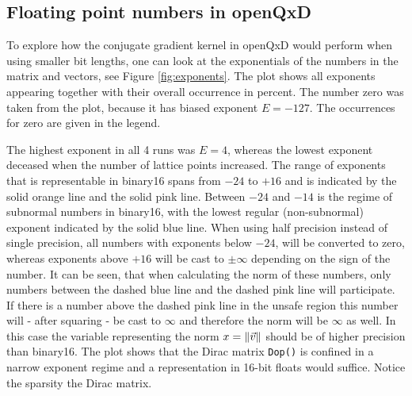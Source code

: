 \documentclass{article}
\theoremstyle{plain} %
\theoremstyle{convention} %
\theoremstyle{remark} %
\def\code#1{\texttt{#1}}
\numberwithin{equation}{section}
\begin{document}
\begin{figure}
    \label{fig:number_line}
\end{figure}

\subsection{Floating point numbers in openQxD}

To explore how the conjugate gradient kernel in openQxD would perform when using smaller bit lengths, one can look at the exponentials of the numbers in the matrix and vectors, see Figure \ref{fig:exponents}. The plot shows all exponents appearing together with their overall occurrence in percent. The number zero was taken from the plot, because it has biased exponent $E=-127$. The occurrences for zero are given in the legend.

The highest exponent in all 4 runs was $E=4$, whereas the lowest exponent deceased when the number of lattice points increased. The range of exponents that is representable in \gls{binary16} spans from \textcolor{corange}{$-24$} to \textcolor{cpink}{$+16$} and is indicated by the \textcolor{corange}{solid orange line} and the \textcolor{cpink}{solid pink line}. Between \textcolor{corange}{$-24$} and \textcolor{cblue}{$-14$} is the regime of subnormal numbers in \gls{binary16}, with the lowest regular (non-subnormal) exponent indicated by the \textcolor{cblue}{solid blue line}. When using half precision instead of single precision, all numbers with exponents below \textcolor{corange}{$-24$}, will be converted to zero, whereas exponents above \textcolor{cpink}{$+16$} will be cast to $\pm \infty$ depending on the sign of the number. It can be seen, that when calculating the norm of these numbers, only numbers between the \textcolor{cblue}{dashed blue line} and the \textcolor{cpink}{dashed pink line} will participate. If there is a number above the dashed pink line in the \textcolor{cyellow}{unsafe region} this number will - after squaring - be cast to $\infty$ and therefore the norm will be $\infty$ as well\footnotemark. In this case the variable representing the norm $x = \norm{\vec{v}}$ should be of higher precision than \gls{binary16}. The plot shows that the Dirac matrix \code{Dop()} is confined in a narrow exponent regime and a representation in 16-bit floats would suffice. Notice the sparsity the Dirac matrix.

\end{document}
